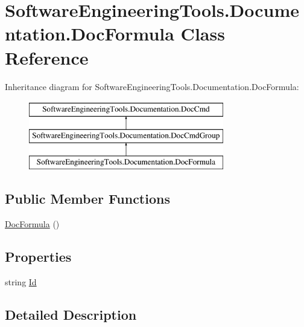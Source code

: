 \hypertarget{class_software_engineering_tools_1_1_documentation_1_1_doc_formula}{\section{Software\+Engineering\+Tools.\+Documentation.\+Doc\+Formula Class Reference}
\label{class_software_engineering_tools_1_1_documentation_1_1_doc_formula}
}
Inheritance diagram for Software\+Engineering\+Tools.\+Documentation.\+Doc\+Formula\+:\begin{figure}[H]
\begin{center}
\leavevmode
\includegraphics[height=3.000000cm]{class_software_engineering_tools_1_1_documentation_1_1_doc_formula}
\end{center}
\end{figure}
\subsection*{Public Member Functions}
\begin{DoxyCompactItemize}
\item 
\hyperlink{class_software_engineering_tools_1_1_documentation_1_1_doc_formula_a12e0223aeac7a696926fa4c0dbbadacd}{Doc\+Formula} ()
\end{DoxyCompactItemize}
\subsection*{Properties}
\begin{DoxyCompactItemize}
\item 
string \hyperlink{class_software_engineering_tools_1_1_documentation_1_1_doc_formula_af0946e5bef66d6f9ad930939c5ddcc51}{Id}
\end{DoxyCompactItemize}


\subsection{Detailed Description}


